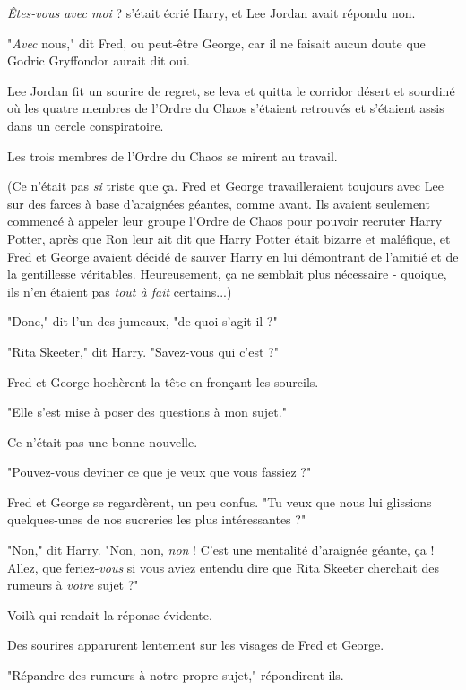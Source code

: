 \emph{Êtes-vous avec moi} ? s'était écrié Harry, et Lee Jordan avait répondu non.

"\emph{Avec} nous," dit Fred, ou peut-être George, car il ne faisait aucun doute que Godric Gryffondor aurait dit oui.

Lee Jordan fit un sourire de regret, se leva et quitta le corridor désert et sourdiné où les quatre membres de l'Ordre du Chaos s'étaient retrouvés et s'étaient assis dans un cercle conspiratoire.

Les trois membres de l'Ordre du Chaos se mirent au travail.

(Ce n'était pas \emph{si}  triste que ça. Fred et George travailleraient toujours avec Lee sur des farces à base d'araignées géantes, comme avant. Ils avaient seulement commencé à appeler leur groupe l'Ordre de Chaos pour pouvoir recruter Harry Potter, après que Ron leur ait dit que Harry Potter était bizarre et maléfique, et Fred et George avaient décidé de sauver Harry en lui démontrant de l'amitié et de la gentillesse véritables. Heureusement, ça ne semblait plus nécessaire - quoique, ils n'en étaient pas \emph{tout à fait} certains...)

"Donc," dit l'un des jumeaux, "de quoi s'agit-il ?"

"Rita Skeeter," dit Harry. "Savez-vous qui c'est ?"

Fred et George hochèrent la tête en fronçant les sourcils.

"Elle s'est mise à poser des questions à mon sujet."

Ce n'était pas une bonne nouvelle.

"Pouvez-vous deviner ce que je veux que vous fassiez ?"

Fred et George se regardèrent, un peu confus. "Tu veux que nous lui glissions quelques-unes de nos sucreries les plus intéressantes ?"

"Non," dit Harry. "Non, non, \emph{non}  ! C'est une mentalité d'araignée géante, ça ! Allez, que feriez-\emph{vous}  si vous aviez entendu dire que Rita Skeeter cherchait des rumeurs à \emph{votre} sujet ?"

Voilà qui rendait la réponse évidente.

Des sourires apparurent lentement sur les visages de Fred et George.

"Répandre des rumeurs à notre propre sujet," répondirent-ils.

